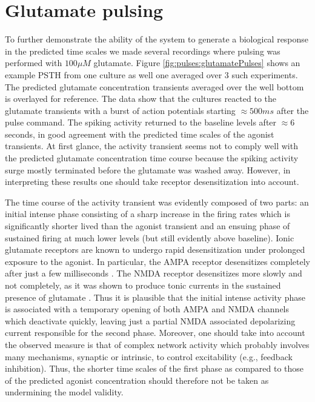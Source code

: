 \section{Glutamate pulsing}
To further demonstrate the ability of the system to generate a biological response in the predicted time scales we made several recordings where pulsing was performed with \(100 \mu M\) glutamate. Figure \ref{fig:pulses:glutamatePulses} shows an example PSTH from one culture as well one averaged over 3 such experiments. The predicted glutamate concentration transients averaged over the well bottom is overlayed for reference. The data show that the cultures reacted to the glutamate transients with a burst of action potentials starting \(\approx 500 ms\) after the pulse command. The spiking activity returned to the baseline levels after \(\approx 6\) seconds, in good agreement with the predicted time scales of the agonist transients. At first glance, the activity transient seems not to comply well with the predicted glutamate concentration time course because the spiking activity surge mostly terminated before the glutamate was washed away. However, in interpreting these results one should take receptor desensitization into account.

The time course of the activity transient was evidently composed of two parts: an initial intense phase consisting of a sharp increase in the firing rates which is significantly shorter lived than the agonist transient and an ensuing phase of sustained firing at much lower levels (but still evidently above baseline). Ionic glutamate receptors are known to undergo rapid desensitization under prolonged exposure to the agonist. In particular, the AMPA receptor desensitizes completely after just a few milliseconds \cite{trussell1993desensitization}. The NMDA receptor desensitizes more slowly \cite{mayer1985action} and not completely, as it was shown to produce tonic currents in the sustained presence of glutamate \cite{sah1989tonic}. Thus it is plausible that the initial intense activity phase is associated with a temporary opening of both AMPA and NMDA channels which deactivate quickly, leaving just a partial NMDA associated depolarizing current responsible for the second phase. Moreover, one should take into account the observed measure is that of complex network activity which probably involves many mechanisms, synaptic or intrinsic, to control excitability (e.g., feedback inhibition). Thus, the shorter time scales of the first phase as compared to those of the predicted agonist concentration should therefore not be taken as undermining the model validity.

